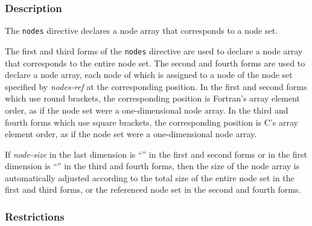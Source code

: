 \subsubsection*{Description}

The {\tt nodes} directive declares a node array that corresponds to a node set.

The first and third forms of the {\tt nodes} directive are used to declare a node
array that corresponds to the entire node set.
The second and fourth forms are used to declare a node array, each node of which is
assigned to a node of the node set specified by {\it nodes-ref} at the
corresponding position.
In the first and second forms which use round brackets,
the corresponding position is Fortran’s array element order, as if the node set were a one-dimensional node array.
In the third and fourth forms which use square brackets,
the corresponding position is C’s array element order, as if the node set were a one-dimensional node array.

%

If {\it node-size} in the last dimension is ``{\tt *}'' in the first and second forms
or in the first dimension is ``{\tt *}'' in the third and fourth forms, then the size
of the node array is automatically adjusted according to the total size
of the entire node set in the first and third forms, 
or the referenced node set in the second and fourth forms.

\subsubsection*{Restrictions}

